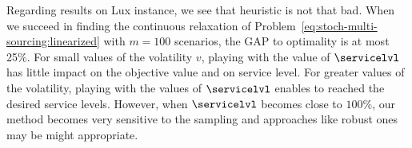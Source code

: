 Regarding results on Lux instance, we see that heuristic is not that bad.
When we succeed in finding the continuous relaxation of Problem~\eqref{eq:stoch-multi-sourcing:linearized} with $m=100$ scenarios, the GAP to optimality is at most 25\%.
For small values of the volatility $v$, playing with the value of $\servicelvl$ has little impact on the objective value and on service level.
For greater values of the volatility, playing with the values of $\servicelvl$ enables to reached the desired service levels.
However, when $\servicelvl$ becomes close to $100\%$, our method becomes very sensitive to the sampling and approaches like robust ones may be might appropriate.





